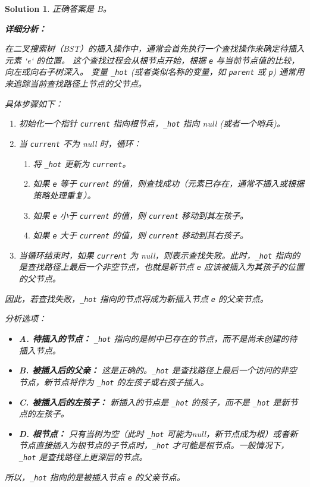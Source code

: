 \documentclass[UTF8]{report}
\newtheorem{solution}{Solution}
\theoremstyle{MyLineTheoremStyle} %
\theoremstyle{MyBlockTheoremStyle} %
\theoremstyle{MySubsubsectionStyle} %
\begin{document}
\begin{solution}
正确答案是 B。

\textbf{详细分析：}

在二叉搜索树（BST）的插入操作中，通常会首先执行一个查找操作来确定待插入元素 `e` 的位置。
这个查找过程会从根节点开始，根据 \texttt{e} 与当前节点值的比较，向左或向右子树深入。
变量 \texttt{\_hot} (或者类似名称的变量，如 \texttt{parent} 或 \texttt{p}) 通常用来追踪当前查找路径上节点的父节点。

具体步骤如下：
\begin{enumerate}
    \item 初始化一个指针 \texttt{current} 指向根节点，\texttt{\_hot} 指向 null (或者一个哨兵)。
    \item 当 \texttt{current} 不为 null 时，循环：
    \begin{enumerate}
        \item 将 \texttt{\_hot} 更新为 \texttt{current}。
        \item 如果 \texttt{e} 等于 \texttt{current} 的值，则查找成功（元素已存在，通常不插入或根据策略处理重复）。
        \item 如果 \texttt{e} 小于 \texttt{current} 的值，则 \texttt{current} 移动到其左孩子。
        \item 如果 \texttt{e} 大于 \texttt{current} 的值，则 \texttt{current} 移动到其右孩子。
    \end{enumerate}
    \item 当循环结束时，如果 \texttt{current} 为 null，则表示查找失败。此时，\texttt{\_hot} 指向的是查找路径上最后一个非空节点，也就是新节点 \texttt{e} 应该被插入为其孩子的位置的父节点。
\end{enumerate}

因此，若查找失败，\texttt{\_hot} 指向的节点将成为新插入节点 \texttt{e} 的父亲节点。

分析选项：
\begin{itemize}
    \item \textbf{A. 待插入的节点：} \texttt{\_hot} 指向的是树中已存在的节点，而不是尚未创建的待插入节点。
    \item \textbf{B. 被插入后的父亲：} 这是正确的。\texttt{\_hot} 是查找路径上最后一个访问的非空节点，新节点将作为 \texttt{\_hot} 的左孩子或右孩子插入。
    \item \textbf{C. 被插入后的左孩子：} 新插入的节点是 \texttt{\_hot} 的孩子，而不是 \texttt{\_hot} 是新节点的左孩子。
    \item \textbf{D. 根节点：} 只有当树为空（此时 \texttt{\_hot} 可能为null，新节点成为根）或者新节点直接插入为根节点的子节点时，\texttt{\_hot} 才可能是根节点。一般情况下，\texttt{\_hot} 是查找路径上更深层的节点。
\end{itemize}

所以，\texttt{\_hot} 指向的是被插入节点 \texttt{e} 的父亲节点。
\end{solution}
\end{document}
